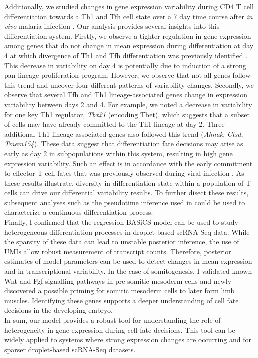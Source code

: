 \newpage

Additionally, we studied changes in gene expression variability during CD4\plus{} T cell differentiation towards a Th1 and Tfh cell state over a 7 day time course after \textit{in vivo} malaria infection \citep{Lonnberg2017}. Our analysis provides several insights into this differentiation system. Firstly, we observe a tighter regulation in gene expression among genes that do not change in mean expression during differentiation at day 4 at which divergence of Th1 and Tfh differentiation was previously identified \citep{Lonnberg2017}. This decrease in variability on day 4 is potentially due to induction of a strong pan-lineage proliferation program. However, we observe that not all genes follow this trend and uncover four different patterns of variability changes. Secondly, we observe that several Tfh and Th1 lineage-associated genes change in expression variability between days 2 and 4. For example, we noted a decrease in variability for one key Th1 regulator, \textit{Tbx21} (encoding Tbet), which suggests that a subset of cells may have already committed to the Th1 lineage at day 2. Three additional Th1 lineage-associated genes also followed this trend (\textit{Ahnak}, \textit{Ctsd}, \textit{Tmem154}). These data suggest that differentiation fate decisions may arise as early as day 2 in subpopulations within this system, resulting in high gene expression variability. Such an effect is in accordance with the early commitment to effector T cell fates that was previously observed during viral infection \citep{Choi2011}. As these results illustrate, diversity in differentiation state within a population of T cells can drive our differential variability results. To further disect these results, subsequent analyses such as the pseudotime inference used in \cite{Lonnberg2017} could be used to characterize a continuous differentiation process.\\

Finally, I confirmed that the regression BASiCS model can be used to study heterogeneous differentiation processes in droplet-based scRNA-Seq data. While the sparsity of these data can lead to unstable posterior inference, the use of UMIs allow robust measurement of transcript counts. Therefore, posterior estimates of model parameters can be used to detect changes in mean expression and in transcriptional variability. In the case of somitogenesis, I validated known Wnt and Fgf signalling pathways in pre-somitic mesoderm cells and newly discovered a possible priming for somitic mesoderm cells to later form limb muscles. Identifying these genes supports a deeper understanding of cell fate decisions in the developing embryo.\\

In sum, our model provides a robust tool for understanding the role of heterogeneity in gene expression during cell fate decisions. This tool can be widely applied to systems where strong expression changes are occurring and for sparser droplet-based scRNA-Seq datasets.


